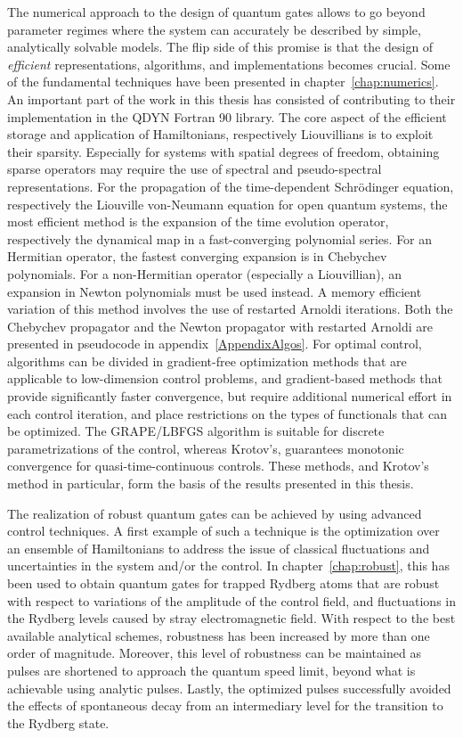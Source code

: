 The numerical approach to the design of quantum gates allows to go beyond
parameter regimes where the system can accurately be described by simple,
analytically solvable models. The flip side of this promise is that the design
of \emph{efficient} representations, algorithms, and implementations becomes
crucial. Some of the fundamental techniques have been presented in
chapter~\ref{chap:numerics}.
An important part of the work in this thesis has consisted of contributing to
their implementation in the QDYN Fortran 90 library.
The core aspect of the efficient storage and
application of Hamiltonians, respectively Liouvillians is to exploit their
sparsity. Especially for systems with spatial degrees of freedom, obtaining
sparse operators may require the use of spectral and pseudo-spectral
representations. For the propagation of the time-dependent Schrödinger equation,
respectively the Liouville von-Neumann equation for open quantum systems, the
most efficient method is the expansion of the time evolution operator,
respectively the dynamical map in a fast-converging polynomial series. For an
Hermitian operator, the fastest converging expansion is in Chebychev
polynomials. For a non-Hermitian operator (especially a Liouvillian), an
expansion in Newton polynomials must be used instead. A memory efficient
variation of this method involves the use of restarted Arnoldi iterations. Both
the Chebychev propagator and the Newton propagator with restarted Arnoldi are
presented in pseudocode in appendix~\ref{AppendixAlgos}. For optimal control,
algorithms can be divided in gradient-free optimization methods that are
applicable to low-dimension control problems, and gradient-based methods that
provide significantly faster convergence, but require additional numerical
effort in each control iteration, and place restrictions on the types of
functionals that can be optimized. The GRAPE/LBFGS algorithm is suitable for
discrete parametrizations of the control, whereas Krotov's,
guarantees monotonic convergence for quasi-time-continuous controls.
These methods, and Krotov's method in particular, form the basis of the
results presented in this thesis.

The realization of robust quantum gates can be achieved by using advanced
control techniques. A first example of such a technique is the optimization over
an ensemble of Hamiltonians to address the issue of classical fluctuations and
uncertainties in the system and/or the control. In chapter~\ref{chap:robust},
this has been used to obtain quantum gates for trapped Rydberg atoms that are
robust with respect to  variations of the amplitude of the control field, and
fluctuations in the Rydberg levels caused by stray electromagnetic field. With
respect to the best available analytical schemes, robustness has been increased
by more than one order of magnitude. Moreover, this level of robustness can be
maintained as pulses are shortened to approach the quantum speed limit, beyond
what is achievable using analytic pulses. Lastly, the optimized pulses
successfully avoided the effects of spontaneous decay from an intermediary level
for the transition to the Rydberg state.

